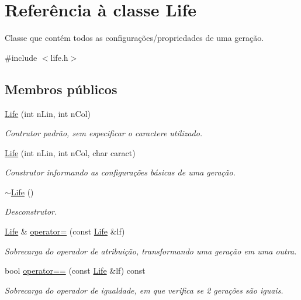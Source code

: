 \hypertarget{classLife}{}\section{Referência à classe Life}
\label{classLife}


Classe que contém todos as configurações/propriedades de uma geração.  




{\ttfamily \#include $<$life.\+h$>$}

\subsection*{Membros públicos}
\begin{DoxyCompactItemize}
\item 
\hyperlink{classLife_a9c54ff69842ec7e1f6195686abd48bfc}{Life} (int n\+Lin, int n\+Col)
\begin{DoxyCompactList}\small\item\em Contrutor padrão, sem especificar o caractere utilizado. \end{DoxyCompactList}\item 
\hyperlink{classLife_ab1c77136658b414aed166fb5746dd7ef}{Life} (int n\+Lin, int n\+Col, char caract)
\begin{DoxyCompactList}\small\item\em Construtor informando as configurações básicas de uma geração. \end{DoxyCompactList}\item 
\hyperlink{classLife_ac5a521e06906fb4f834001b2b4f7adc7}{$\sim$\+Life} ()
\begin{DoxyCompactList}\small\item\em Desconstrutor. \end{DoxyCompactList}\item 
\hyperlink{classLife}{Life} \& \hyperlink{classLife_a79902e1e85146df19fb2b920899a5a36}{operator=} (const \hyperlink{classLife}{Life} \&lf)
\begin{DoxyCompactList}\small\item\em Sobrecarga do operador de atribuição, transformando uma geração em uma outra. \end{DoxyCompactList}\item 
bool \hyperlink{classLife_a50ef5ca2efcc8053b8d54fad159722cb}{operator==} (const \hyperlink{classLife}{Life} \&lf) const
\begin{DoxyCompactList}\small\item\em Sobrecarga do operador de igualdade, em que verifica se 2 gerações são iguais. \end{DoxyCompactList}\item 

\end{DoxyCompactItemize}

